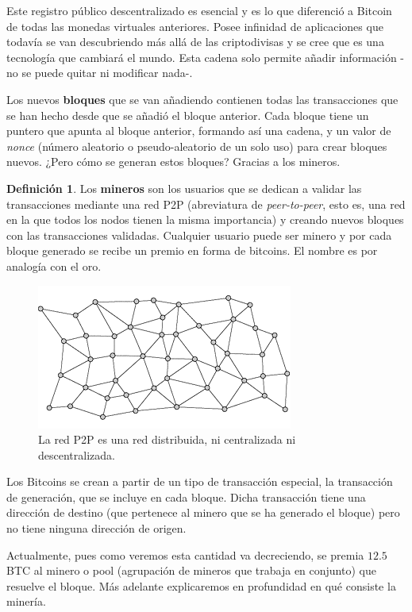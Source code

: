 \documentclass[twoside]{article}
\theoremstyle{definition}
\newtheorem{defi}[teorema]{Definición}
\begin{document}
Este registro público descentralizado es esencial y es lo que diferenció a Bitcoin de todas las monedas virtuales anteriores. Posee infinidad de aplicaciones que todavía se van descubriendo más allá de las criptodivisas y se cree que es una tecnología que cambiará el mundo. Esta cadena solo permite añadir información -no se puede quitar ni modificar nada-. 

Los nuevos \textbf{bloques} que se van añadiendo contienen todas las transacciones que se han hecho desde que se añadió el bloque anterior. Cada bloque tiene un puntero que apunta al bloque anterior, formando así una cadena, y un valor de \textit{nonce} (número aleatorio o pseudo-aleatorio de un solo uso) para crear bloques nuevos. ¿Pero cómo se generan estos bloques? Gracias a los mineros.
\begin{defi}
Los \textbf{mineros} son los usuarios que se dedican a validar las transacciones mediante una red P2P (abreviatura de \emph{peer-to-peer}, esto es, una red en la que todos los nodos tienen la misma importancia) y creando nuevos bloques con las transacciones validadas. Cualquier usuario puede ser minero y por cada bloque generado se recibe un premio en forma de bitcoins. El nombre es por analogía con el oro.
\end{defi}

\begin{figure}[h]
\includegraphics[scale=0.45]{distrib}
\captionsetup{labelformat=empty}
 \caption{La red P2P es una red distribuida, ni centralizada ni descentralizada.}
\end{figure}

Los Bitcoins se crean a partir de un tipo de transacción especial, la transacción de generación, que se incluye en cada bloque. Dicha transacción tiene una dirección de destino (que pertenece al minero que se ha generado el bloque) pero no tiene ninguna dirección de origen. 

Actualmente, pues como veremos esta cantidad va decreciendo, se premia $12.5$ BTC al minero o pool (agrupación de mineros que trabaja en conjunto) que resuelve el bloque. Más adelante explicaremos en profundidad en qué consiste la minería.
\end{document}
